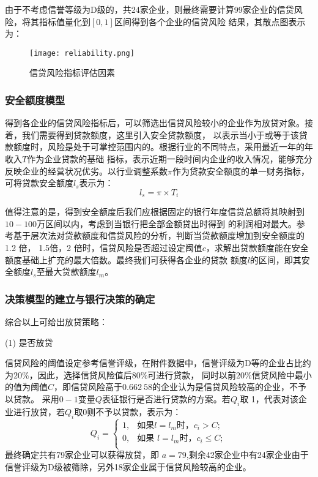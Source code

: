\documentclass[withoutpreface,bwprint]{cumcmthesis}
\begin{document}
    由于不考虑信誉等级为D级的，共24家企业，则最终需要计算99家企业的信贷风险，将其指标值量化到$[0, 1]$区间得到各个企业的信贷风险
    结果，其散点图表示为：

    \begin{figure}[H]
        \centering
        \texttt{[image: reliability.png]}
        \caption{信贷风险指标评估因素}
        \label{fig:reliability}
    \end{figure}

\subsubsection{安全额度模型}
得到各企业的信贷风险指标后，可以筛选出信贷风险较小的企业作为放贷对象。接着，我们需要得到贷款额度，这里引入安全贷款额度，
以表示当小于或等于该贷款额度时，风险是处于可掌控范围内的。根据行业的不同特点，采用最近一年的年收入$T$作为企业贷款的基础
指标，表示近期一段时间内企业的收入情况，能够充分反映企业的经营状况优劣。以行业调整系数$\pi$作为贷款安全额度的单一财务指标，
可将贷款安全额度$l_s$表示为：
\begin{equation}
    l_s = \pi\times T_i  
\end{equation}

值得注意的是，得到安全额度后我们应根据固定的银行年度信贷总额将其映射到$10-100$万区间以内，考虑到当银行把全部金额贷出时得到
的利润相对最大。参考\cite{dangxinlu2016}基于层次法对贷款额度和信贷风险的分析，判断当贷款额度增加到安全额度的 1.2 倍，
1.5倍，2 倍时，信贷风险是否超过设定阈值$c$，求解出贷款额度能在安全额度基础上扩充的最大倍数。最终我们可获得各企业的贷款
额度$l$的区间，即其安全额度$l_s$至最大贷款额度$l_m$。

\subsubsection{决策模型的建立与银行决策的确定}
综合以上可给出放贷策略：

(1) 是否放贷

信贷风险的阈值设定参考信誉评级，在附件数据中，信誉评级为D等的企业占比约为$20\%$，因此，选择信贷风险值后$80\%$可进行贷款，
同时以前$20\%$信贷风险中最小的值为阈值$C$，即信贷风险高于$0.662\ 58$的企业认为是信贷风险较高的企业，不予以贷款。
采用$0-1$变量$Q$表征银行是否进行贷款的方案。若$Q_i$取 1，代表对该企业进行放贷，若$Q_i$取0则不予以贷款，表示为：
\begin{equation}
    Q_i = \begin{cases}
        1, &\text{如果} l = l_m \text{时，}c_i > C;\\
        0, &\text{如果 } l = l_m \text{时，}c_i \leqslant C;\\
    \end{cases}
\end{equation}
最终确定共有79家企业可以获得放贷，即 $a = 79$,剩余42家企业中有24家企业由于信誉评级为D级被筛除，另外18家企业属于信贷风险较高的企业。
\end{document}
